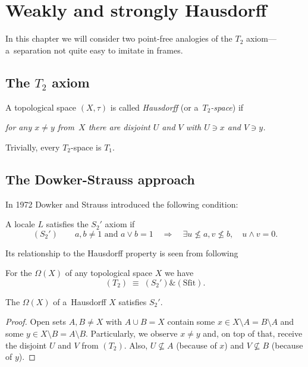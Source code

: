 \chapter{Weakly and strongly Hausdorff}

In this chapter we will consider two point-free analogies of the $T_2$
axiom---a~separation not quite easy to imitate in frames.

\section{The $T_2$ axiom}

\begin{framed}
  \begin{df}[$T_2$]
    A topological space $(X, \tau)$ is called \emph{Hausdorff\/} (or
    a~\emph{$T_2$-space\/}) if
    \begin{center} \it
      for any $x \ne y$ from~$X$ there are disjoint $U$ and $V$ with $U\owns x$
      and $V\owns y$.
    \end{center}
  \end{df}
\end{framed}

\begin{rem} \label{T2->T1}
  Trivially, every $T_2$-space is $T_1$.
\end{rem}

\section{The Dowker-Strauss approach}

In 1972 Dowker and Strauss \cite{ds72} introduced the following condition:

\begin{framed}
  \begin{df}
    A locale $L$ satisfies the $S_2'$ axiom if
    \[
      (S_2') \qquad
      a, b \ne 1 \text{ and } a \vee b = 1 \quad \Rightarrow \quad \exists
      u\not\leq a, v\not\leq b, \quad u \wedge v = 0.
    \]
  \end{df}
\end{framed}

Its relationship to the Hausdorff property is seen from following
\begin{thm} \label{thm:T2=S2'+Sfit}
  For the $\Omega(X)$ of any topological space $X$ we have
  \[
    (T_2) \; \equiv \; (S_2') \& (\text{Sfit}).
  \]
\end{thm}

\begin{lem} \label{Haus->S2'}
  The $\Omega(X)$ of a~Hausdorff $X$ satisfies $S_2'$.
\end{lem}
\begin{proof}
  Open sets $A, B \ne X$ with $A \cup B = X$ contain some $x\in X\setminus A =
  B\setminus A$ and some $y\in X\setminus B = A\setminus B$.
  Particularly, we observe $x \ne y$ and, on top of that, receive the disjoint
  $U$ and $V$ from $(T_2)$.
  Also, $U\not\subseteq A$ (because of $x$) and $V\not\subseteq B$ (because of
  $y$).
\end{proof}

